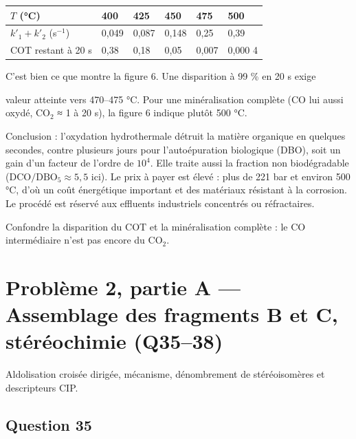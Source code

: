 \documentclass[11pt,a4paper]{article}
\renewcommand{\geq}{\geqslant}
\newcommand{\equationajustee}[1]{%
  \sbox{\boiteequation}{$\displaystyle #1$}%
  \ifdim\wd\boiteequation>\linewidth
    \[\resizebox{\linewidth}{!}{\usebox{\boiteequation}}\]%
  \else
    \[#1\]%
  \fi}
\begin{document}
\begin{longtable}[]{@{}llllll@{}}
\toprule\noalign{}
\(T\) (°C) & 400 & 425 & 450 & 475 & 500 \\
\midrule\noalign{}
\endhead
\bottomrule\noalign{}
\endlastfoot
\(k'_1+k'_2\) (s\(^{-1}\)) & 0,049 & 0,087 & 0,148 & 0,25 & 0,39 \\
COT restant à 20 s & 0,38 & 0,18 & 0,05 & 0,007 & 0,000 4 \\
\end{longtable}

C'est bien ce que montre la figure 6. Une disparition à 99 \% en 20 s exige

\equationajustee{k'_1+k'_2\geq\frac{\ln 100}{20}\approx0{,}23\ \mathrm{s^{-1}},}

valeur atteinte vers 470--475 °C. Pour une minéralisation complète (CO lui aussi oxydé, CO\(_2\) ≈ 1 à 20 s), la figure 6 indique plutôt 500 °C.

\equationajustee{\boxed{T\approx475\text{–}500\ \text{°C}}}

Conclusion : l'oxydation hydrothermale détruit la matière organique en quelques secondes, contre plusieurs jours pour l'autoépuration biologique (DBO), soit un gain d'un facteur de l'ordre de \(10^4\). Elle traite aussi la fraction non biodégradable (\(\mathrm{DCO}/\mathrm{DBO_5}\approx5{,}5\) ici). Le prix à payer est élevé : plus de 221 bar et environ 500 °C, d'où un coût énergétique important et des matériaux résistant à la corrosion. Le procédé est réservé aux effluents industriels concentrés ou réfractaires.

\begin{piege}

Confondre la disparition du COT et la minéralisation complète : le CO intermédiaire n'est pas encore du CO\(_2\).

\end{piege}

\hypertarget{probluxe8me-2-partie-a-assemblage-des-fragments-b-et-c-stuxe9ruxe9ochimie-q3538}{%
\section{Problème 2, partie A --- Assemblage des fragments B et C, stéréochimie (Q35--38)}\label{probluxe8me-2-partie-a-assemblage-des-fragments-b-et-c-stuxe9ruxe9ochimie-q3538}}

Aldolisation croisée dirigée, mécanisme, dénombrement de stéréoisomères et descripteurs CIP.

\hypertarget{question-35}{%
\subsection{Question 35}\label{question-35}}
\end{document}

